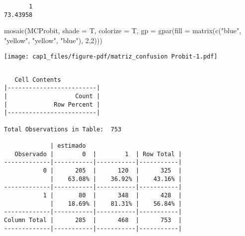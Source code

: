 \documentclass[
  letterpaper,
  DIV=11,
  numbers=noendperiod]{scrreprt}
\newenvironment{Shaded}{\begin{snugshade}}{\end{snugshade}}
\newcommand{\AttributeTok}[1]{\textcolor[rgb]{0.40,0.45,0.13}{#1}}
\newcommand{\DecValTok}[1]{\textcolor[rgb]{0.68,0.00,0.00}{#1}}
\newcommand{\FunctionTok}[1]{\textcolor[rgb]{0.28,0.35,0.67}{#1}}
\newcommand{\NormalTok}[1]{\textcolor[rgb]{0.00,0.23,0.31}{#1}}
\newcommand{\SpecialCharTok}[1]{\textcolor[rgb]{0.37,0.37,0.37}{#1}}
\newcommand{\StringTok}[1]{\textcolor[rgb]{0.13,0.47,0.30}{#1}}
\begin{document}
\begin{verbatim}
       1 
73.43958 
\end{verbatim}

\begin{Shaded}
\begin{Highlighting}[]
\FunctionTok{mosaic}\NormalTok{(MCProbit, }
       \AttributeTok{shade =}\NormalTok{ T, }
       \AttributeTok{colorize =}\NormalTok{ T,}
       \AttributeTok{gp =} \FunctionTok{gpar}\NormalTok{(}\AttributeTok{fill =} \FunctionTok{matrix}\NormalTok{(}\FunctionTok{c}\NormalTok{(}\StringTok{"blue"}\NormalTok{, }\StringTok{"yellow"}\NormalTok{, }\StringTok{"yellow"}\NormalTok{, }\StringTok{"blue"}\NormalTok{),}
                               \DecValTok{2}\NormalTok{,}\DecValTok{2}\NormalTok{)))}
\end{Highlighting}
\end{Shaded}

\texttt{[image: cap1\_files/figure-pdf/matriz\_confusion Probit-1.pdf]}

\begin{Shaded}
\end{Shaded}

\begin{verbatim}

   Cell Contents
|-------------------------|
|                   Count |
|             Row Percent |
|-------------------------|

Total Observations in Table:  753 

             | estimado 
   Observado |        0  |        1  | Row Total | 
-------------|-----------|-----------|-----------|
           0 |      205  |      120  |      325  | 
             |    63.08% |    36.92% |    43.16% | 
-------------|-----------|-----------|-----------|
           1 |       80  |      348  |      428  | 
             |    18.69% |    81.31% |    56.84% | 
-------------|-----------|-----------|-----------|
Column Total |      285  |      468  |      753  | 
-------------|-----------|-----------|-----------|

 
\end{verbatim}
\end{document}
